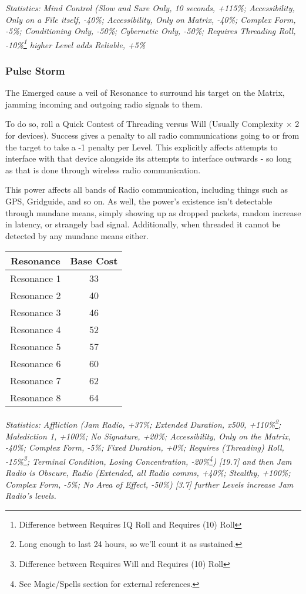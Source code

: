 \begin{multicols*}{3}
	\textcolor{OliveGreen}{\textit{Statistics: Mind Control (Slow and Sure Only, 10 seconds, +115\%; Accessibility, Only on a File itself, -40\%; Accessibility, Only on Matrix, -40\%; Complex Form, -5\%; Conditioning Only, -50\%; Cybernetic Only, -50\%; Requires Threading Roll, -10\%\footnote{Difference between Requires IQ Roll and Requires (10) Roll} higher Level adds Reliable, +5\%}}
	
	\subsubsection*{Pulse Storm}\label{pulse_storm}
	
	The Emerged cause a veil of Resonance to surround his target on the Matrix, jamming incoming and outgoing radio signals to them.
	
	To do so, roll a Quick Contest of Threading versus Will (Usually Complexity $\times$ 2 for devices). Success gives a penalty to all radio communications going to or from the target to take a -1 penalty per Level. This explicitly affects attempts to interface with that device alongside its attempts to interface outwards - so long as that is done through wireless radio communication.
	
	This power affects all bands of Radio communication, including things such as GPS, Gridguide, and so on. As well, the power's existence isn't detectable through mundane means, simply showing up as dropped packets, random increase in latency, or strangely bad signal. Additionally, when threaded it cannot be detected by any mundane means either.
	
	\begin{center}
		\begin{tabular}{|c|c|}
			\hline
			Resonance & Base Cost\\
			\hline
			\hline
			Resonance 1 & 33 \\
			Resonance 2 & 40 \\
			Resonance 3 & 46 \\
			Resonance 4 & 52 \\
			Resonance 5 & 57 \\
			Resonance 6 & 60 \\
			Resonance 7 & 62 \\
			Resonance 8 & 64 \\
			\hline
		\end{tabular}
	\end{center}
	
	\textcolor{OliveGreen}{\textit{Statistics: Affliction (Jam Radio, +37\%; Extended Duration, x500, +110\%\footnote{Long enough to last 24 hours, so we'll count it as sustained.}; Malediction 1, +100\%; No Signature, +20\%; Accessibility, Only on the Matrix, -40\%; Complex Form, -5\%; Fixed Duration, +0\%; Requires (Threading) Roll, -15\%\footnote{Difference between Requires Will and Requires (10) Roll}; Terminal Condition, Losing Concentration, -20\%\footnote{See Magic/Spells section for external references.}) [19.7] and then Jam Radio is Obscure, Radio (Extended, all Radio comms, +40\%; Stealthy, +100\%; Complex Form, -5\%; No Area of Effect, -50\%) [3.7] further Levels increase Jam Radio's levels.}}
	

\end{multicols*}
